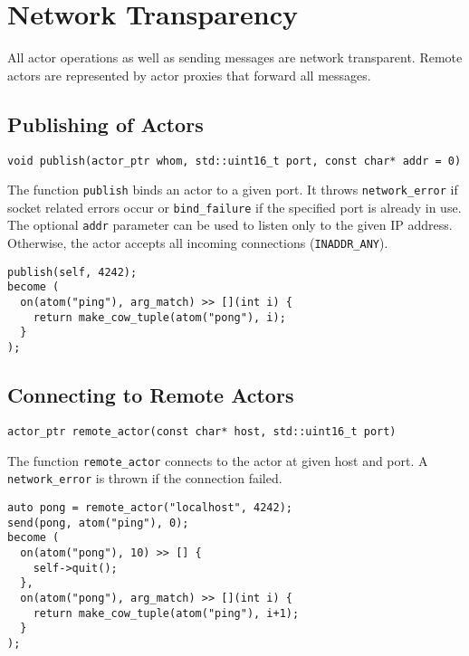 \section{Network Transparency}

All actor operations as well as sending messages are network transparent.
Remote actors are represented by actor proxies that forward all messages.

\subsection{Publishing of Actors}

\begin{lstlisting}
void publish(actor_ptr whom, std::uint16_t port, const char* addr = 0)
\end{lstlisting}

The function \lstinline^publish^ binds an actor to a given port.
It throws \lstinline^network_error^ if socket related errors occur or \lstinline^bind_failure^ if the specified port is already in use.
The optional \lstinline^addr^ parameter can be used to listen only to the given IP address.
Otherwise, the actor accepts all incoming connections (\lstinline^INADDR_ANY^).

\begin{lstlisting}
publish(self, 4242);
become (
  on(atom("ping"), arg_match) >> [](int i) {
    return make_cow_tuple(atom("pong"), i);
  }
);
\end{lstlisting}

\subsection{Connecting to Remote Actors}

\begin{lstlisting}
actor_ptr remote_actor(const char* host, std::uint16_t port)
\end{lstlisting}

The function \lstinline^remote_actor^ connects to the actor at given host and port.
A \lstinline^network_error^ is thrown if the connection failed.

\begin{lstlisting}
auto pong = remote_actor("localhost", 4242);
send(pong, atom("ping"), 0);
become (
  on(atom("pong"), 10) >> [] {
    self->quit();
  },
  on(atom("pong"), arg_match) >> [](int i) {
    return make_cow_tuple(atom("ping"), i+1);
  }
);
\end{lstlisting}
